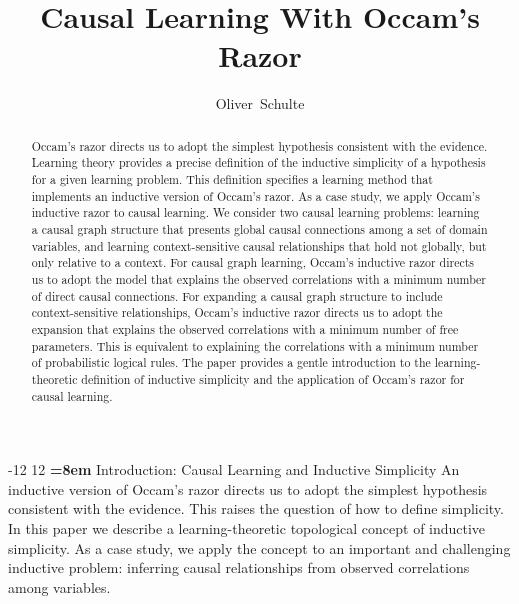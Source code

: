 \documentclass{elsarticle}%
\author[sfu]{Oliver~Schulte\corref{cor1}}
\makeatletter
\renewcommand\section{\@startsection {section}{1}{\z@}%
  {-12\p@ \@plus -4\p@ \@minus -4\p@}%
                       {12\p@ \@plus 4\p@ \@minus 4\p@}%
                                   {\normalfont\large\bfseries\boldmath
                                   \rightskip=\z@ \@plus 8em\pretolerance=10000 }}
\makeatother
\begin{document}
\begin{abstract} Occam's razor directs us to adopt the simplest hypothesis consistent with the evidence. Learning theory provides a precise definition of the inductive simplicity of a hypothesis for a given learning problem. This definition specifies a learning method that implements an inductive version of Occam's razor. As a case study, we apply Occam's inductive razor to causal learning. We consider two causal learning problems: learning a causal graph structure that presents global causal connections among a set of domain variables, and learning context-sensitive causal relationships that hold not globally, but only relative to a context. For causal graph learning, Occam's inductive razor directs us to adopt the model that explains the observed correlations with a minimum number of direct causal connections. For expanding a causal graph structure to include context-sensitive relationships, Occam's inductive razor directs us to adopt the expansion that explains the observed correlations with a minimum number of free parameters. This is equivalent to explaining the correlations with a minimum number of probabilistic logical rules. The paper provides a gentle introduction to the learning-theoretic definition of inductive simplicity and the application of Occam's razor for causal learning.
\end{abstract}

\title{Causal Learning With Occam's Razor}

\maketitle
%



\section{Introduction: Causal Learning and Inductive Simplicity}
An inductive version of Occam's razor directs us to adopt the simplest hypothesis consistent with the evidence. This raises the question of how to define simplicity. In this paper we describe a learning-theoretic topological concept of inductive simplicity. As a case study, we apply the concept to an important and challenging inductive problem: inferring causal relationships from observed correlations among variables. 
\end{document}
